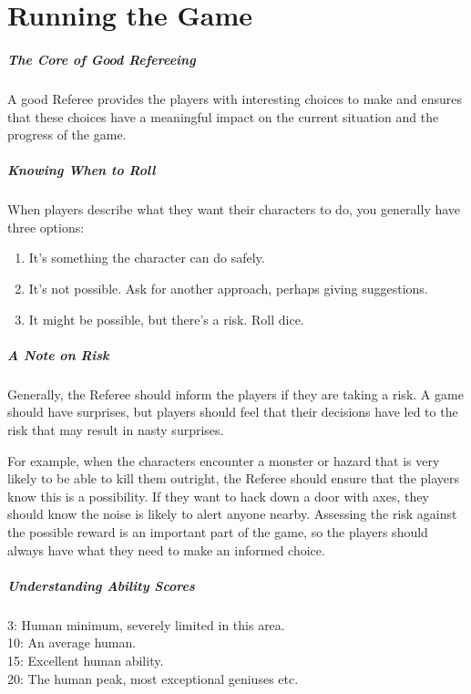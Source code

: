 \documentclass[itdr/core]{subfiles}
\begin{document}

\chapter{Running the Game}
\label{ch:running_the_game}

\paragraph{The Core of Good Refereeing}
A good Referee provides the players with interesting choices to make and ensures that these choices have a meaningful impact on the current situation and the progress of the game.


\paragraph{Knowing When to Roll}
When players describe what they want their characters to do, you generally have three options:
\begin{enumerate}
	\item It's something the character can do safely.
	\item It's not possible. Ask for another approach, \mbox{perhaps} giving suggestions.
	\item It might be possible, but there's a risk. Roll dice.
\end{enumerate}


\paragraph{A Note on Risk}
Generally, the Referee should inform the players if they are taking a risk. A game should have surprises, but players should feel that their decisions have led to the risk that may result in nasty surprises.\tight

For example, when the characters encounter a monster or hazard that is very likely to be able to kill them outright, the Referee should ensure that the players know this is a possibility. If they want to hack down a door with axes, they should know the noise is likely to alert anyone nearby. Assessing the risk against the possible reward is an important part of the game, so the players should always have what they need to make an informed choice.


\paragraph{Understanding Ability Scores}
3: Human minimum, severely limited in this area.\\
10: An average human.\\
15: Excellent human ability.\\
20: The human peak, most exceptional geniuses etc.
\end{document}
